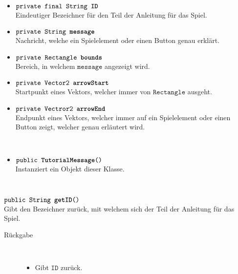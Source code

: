 \begin{description}
\item[Beschreibung] \hfill \\ 
\item[Attribute] \hfill \\
	\vspace{-.8cm}
	\begin{itemize}	
		\item $\texttt{private final String \textbf{ID}}$ \\ Eindeutiger Bezeichner für den Teil der Anleitung für das Spiel.
		\item $\texttt{private String \textbf{message}}$ \\ Nachricht, welche ein Spielelement oder einen Button genau erklärt.
		\item $\texttt{private Rectangle \textbf{bounds}}$ \\ Bereich, in welchem $\texttt{message}$ angezeigt wird.
		\item $\texttt{private Vector2 \textbf{arrowStart}}$ \\ Startpunkt eines Vektors, welcher immer von $\texttt{Rectangle}$ ausgeht.
		\item $\texttt{private Vectror2 \textbf{arrowEnd}}$ \\ Endpunkt eines Vektors, welcher immer auf ein Spielelement oder einen Button zeigt, welcher genau erläutert wird.

		\end{itemize}
	
\item[Konstruktoren] \hfill \\
	\vspace{-.8cm}
	\begin{itemize}
		\item $\texttt{public \textbf{TutorialMessage}()}$ \\ Instanziert ein Objekt dieser Klasse.

	\end{itemize}
	
\item[Methoden] \hfill \\
	\vspace{-.8cm}
		\item $\texttt{public String \textbf{getID}()}$ \\ Gibt den Bezeichner zurück, mit welchem sich der Teil der Anleitung für das Spiel.
		\begin{description}
			\item[Rückgabe] \hfill \\
			\vspace{-.8cm}
			\begin{itemize}
				\item Gibt $\texttt{ID}$ zurück.
			\end{itemize}
			\end{description}
			

\end{description}
